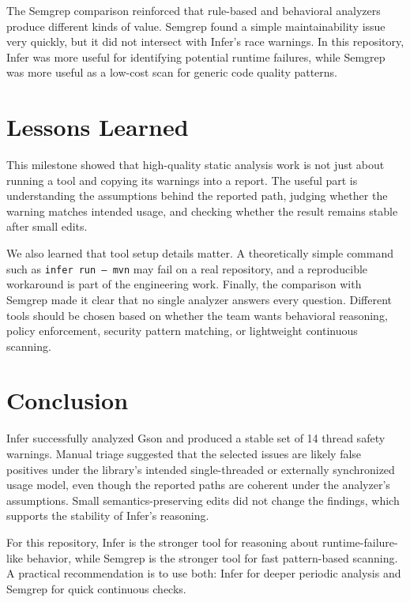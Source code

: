 \documentclass[11pt]{article}
\begin{document}
The Semgrep comparison reinforced that rule-based and behavioral analyzers produce different kinds of value. Semgrep found a simple maintainability issue very quickly, but it did not intersect with Infer's race warnings. In this repository, Infer was more useful for identifying potential runtime failures, while Semgrep was more useful as a low-cost scan for generic code quality patterns.

\section{Lessons Learned}
This milestone showed that high-quality static analysis work is not just about running a tool and copying its warnings into a report. The useful part is understanding the assumptions behind the reported path, judging whether the warning matches intended usage, and checking whether the result remains stable after small edits.

We also learned that tool setup details matter. A theoretically simple command such as \texttt{infer run -- mvn} may fail on a real repository, and a reproducible workaround is part of the engineering work. Finally, the comparison with Semgrep made it clear that no single analyzer answers every question. Different tools should be chosen based on whether the team wants behavioral reasoning, policy enforcement, security pattern matching, or lightweight continuous scanning.

\section{Conclusion}
Infer successfully analyzed Gson and produced a stable set of 14 thread safety warnings. Manual triage suggested that the selected issues are likely false positives under the library's intended single-threaded or externally synchronized usage model, even though the reported paths are coherent under the analyzer's assumptions. Small semantics-preserving edits did not change the findings, which supports the stability of Infer's reasoning.

For this repository, Infer is the stronger tool for reasoning about runtime-failure-like behavior, while Semgrep is the stronger tool for fast pattern-based scanning. A practical recommendation is to use both: Infer for deeper periodic analysis and Semgrep for quick continuous checks.
\end{document}
